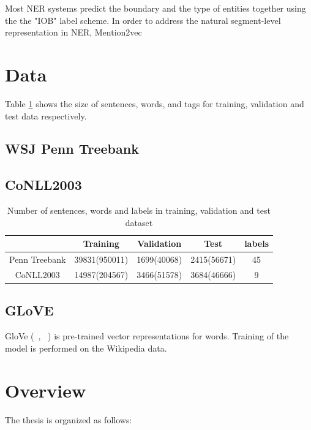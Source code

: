 \documentclass{sfuthesis}
\begin{document}
Most NER systems predict the boundary and the type of entities together using the the "IOB" label scheme. In order to address the natural segment-level representation in NER, Mention2vec
\section{Data}
Table \ref{table:my-dataset} shows the size of sentences, words, and tags for training, validation and test data respectively.
\subsection{WSJ Penn Treebank}
\subsection{CoNLL2003}
\begin{table}[]
\centering
\caption{Number of sentences, words and labels in training, validation and test dataset}
\label{table:my-dataset}
\begin{tabular}{|c|c|c|c|c|} \hline
      & Training  & Validation  & Test  & labels  \\ \hline
Penn Treebank   &39831(950011) &1699(40068) &2415(56671) &45\\\hline
CoNLL2003   &14987(204567) &3466(51578) &3684(46666) &9     \\\hline
 
\end{tabular}
\end{table}

\subsection{GLoVE}

GloVe (~\citeauthor{pennington2014glove}, ~\citeyear{pennington2014glove}) is pre-trained vector representations for words. Training of the model is performed on the Wikipedia data.


\section{Overview}
The thesis is organized as follows:
\end{document}
